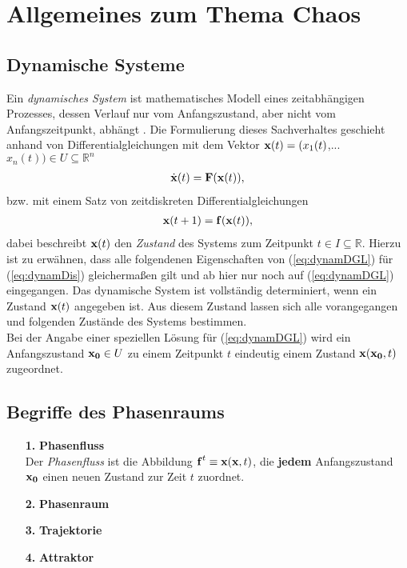 

\section{Allgemeines zum Thema Chaos}
\label{sec:allgemeines}

\subsection{Dynamische Systeme}
\label{sub:dynamSys}
Ein \textit{dynamisches System} ist mathematisches Modell eines zeitabhängigen Prozesses, dessen Verlauf nur vom Anfangszustand, aber nicht vom Anfangszeitpunkt, abhängt \citep[vgl.][]{WikiDynSys}. Die Formulierung dieses Sachverhaltes geschieht anhand von Differentialgleichungen mit dem Vektor $\boldsymbol{\mathbf{x}}(t)=(x_1(t)$,...$x_n(t))\in{U}\subseteq\mathbb{R}^n$
\begin{gather}
    \dot{\boldsymbol{\mathbf{x}}}(t)=\boldsymbol{\mathbf{F}}(\boldsymbol{\mathbf{x}}(t)),
    \label{eq:dynamDGL}
\end{gather}
bzw. mit einem Satz von zeitdiskreten Differentialgleichungen
\begin{gather}
    \boldsymbol{\mathbf{x}}(t+1)=\boldsymbol{\mathbf{f}}(\boldsymbol{\mathbf{x}}(t)),
    \label{eq:dynamDis}
\end{gather}
dabei beschreibt $\boldsymbol{\mathbf{x}}(t)$ den \textit{Zustand} des Systems zum Zeitpunkt $t\in{I}\subseteq\mathbb{R}$. Hierzu ist zu erwähnen, dass alle folgendenen Eigenschaften von (\ref{eq:dynamDGL}) für (\ref{eq:dynamDis}) gleichermaßen gilt und ab hier nur noch auf (\ref{eq:dynamDGL}) eingegangen. Das dynamische System ist vollständig determiniert, wenn ein Zustand $\boldsymbol{\mathbf{x}}(t)$ angegeben ist. Aus diesem Zustand lassen sich alle vorangegangen und folgenden Zustände des Systems bestimmen.\\
Bei der Angabe einer speziellen Lösung für (\ref{eq:dynamDGL}) wird ein Anfangszustand $\boldsymbol{\mathbf{x_0}}\in{U}$ zu einem Zeitpunkt $t$ eindeutig einem Zustand $\boldsymbol{\mathbf{x}}(\boldsymbol{\mathbf{x_0}},t)$ zugeordnet.

\subsection{Begriffe des Phasenraums}
\label{sub:phasenraum}
\begin{itemize}
    \item[\textbf{1.}]\textbf{Phasenfluss}\\
    Der \textit{Phasenfluss} ist die Abbildung $\boldsymbol{\mathbf{f}}^t\equiv\boldsymbol{\mathbf{x}}(\boldsymbol{\mathbf{x}},t)$, die \textbf{jedem} Anfangszustand $\boldsymbol{\mathbf{x_0}}$ einen neuen Zustand zur Zeit $t$ zuordnet. 
    \item[\textbf{2.}]\textbf{Phasenraum}
    \item[\textbf{3.}]\textbf{Trajektorie}
    \item[\textbf{4.}]\textbf{Attraktor}
\end{itemize}

